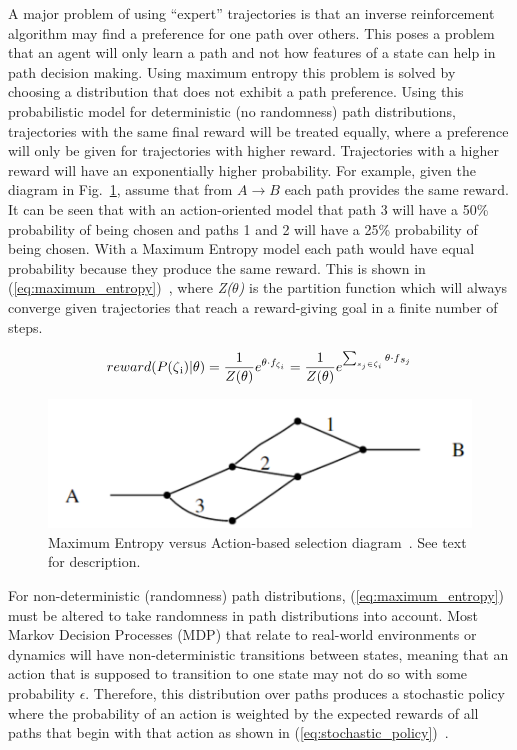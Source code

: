 \documentclass[12pt,american]{report}
\begin{document}
A major problem of using ``expert'' trajectories is that an inverse reinforcement algorithm may find a preference for one path over others.  This poses a problem that an agent will only learn a path and not how features of a state can help in path decision making.  Using maximum entropy this problem is solved by choosing a distribution that does not exhibit a path preference.  Using this probabilistic model for deterministic (no randomness) path distributions, trajectories with the same final reward will be treated equally, where a preference will only be given for trajectories with higher reward.  Trajectories with a higher reward will have an exponentially higher probability. For example, given the diagram in Fig.~\ref{fig:maxent-example}, assume that from $A \rightarrow B$ each path provides the same reward.  It can be seen that with an action-oriented model that path 3 will have a 50\% probability of being chosen and paths 1 and 2 will have a 25\% probability of being chosen.  With a Maximum Entropy model each path would have equal probability because they produce the same reward. This is shown in (\ref{eq:maximum_entropy})~\cite{ziebart2008maximum}, where \textit{Z($\theta$)} is the partition function which will always converge given trajectories that reach a reward-giving goal in a finite number of steps. 

\begin{equation}
            \label{eq:maximum_entropy}
            reward(P(\zeta\textsubscript{i})|\theta)= \frac{1}{Z(\theta)} e^{\theta \cdot f_{\zeta_i}}=  \frac{1}{Z(\theta)} e^{\sum_{s_j\in\zeta_i}^{}\theta \cdot f\textsubscript{$s_j$}}%
        \end{equation}

\begin{figure}
\centering
\includegraphics[scale=.75]{images/maxent-example.png}
\caption{Maximum Entropy versus Action-based selection diagram~\cite{ziebart2008maximum}. See text for description.}
\label{fig:maxent-example}
\end{figure}

For non-deterministic (randomness) path distributions, (\ref{eq:maximum_entropy}) must be altered to take randomness in path distributions into account. Most Markov Decision Processes (MDP) that relate to real-world environments or dynamics will have non-deterministic transitions between states, meaning that an action that is supposed to transition to one state may not do so with some probability $\epsilon$.  Therefore, this distribution over paths produces a stochastic policy where the probability of an action is weighted by the expected rewards of all paths that begin with that action as shown in (\ref{eq:stochastic_policy})~\cite{ziebart2008maximum}.
\end{document}
